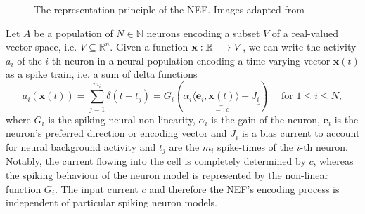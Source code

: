 \begin{figure}[t!]
{	}
	\caption{The representation principle of the \ac{NEF}. Images adapted from \cite{Bekolay2014}}\label{fig:nef_representation}
\end{figure}
Let $A$ be a population of $N \in \mathbb{N}$ neurons encoding a subset $V$ of a real-valued vector space, i.e. $V\subseteq \mathbb{R}^{n}$.
Given a function $\mathbf{x}: \mathbb{R} \longrightarrow V$, we can write the activity $a_{i}$ of the $i$-th neuron in a neural population encoding a time-varying vector $\mathbf{x}(t)$ as a spike train, i.e. a sum of delta functions
\begin{equation}
a_{i}\left(\mathbf{x}(t)\right) = \sum_{j=1}^{m_{i}} \delta(t - t_{j}) = G_{i}(\underbrace{\alpha_{i}\langle\mathbf{e}_{i},\mathbf{x}(t)\rangle + J_{i}}_{=:c}) \quad \textrm{ for } 1 \leq i \leq N,
\label{eq:nef_encoding}
\end{equation}
where $G_{i}$ is the spiking neural non-linearity, $\alpha_{i}$ is the gain of the neuron, $\mathbf{e}_{i}$ is the neuron's preferred direction or encoding vector and $J_{i}$ is a bias current to account for neural background activity and $t_{j}$ are the $m_{i}$ spike-times of the $i$-th neuron.
Notably, the current flowing into the cell is completely determined by $c$, whereas the spiking behaviour of the neuron model is represented by the non-linear function $G_{i}$.
The input current $c$ and therefore the \ac{NEF}'s encoding process is independent of particular spiking neuron models.

